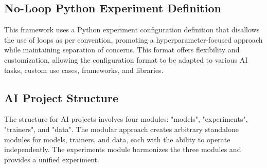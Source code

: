 \subsection{No-Loop Python Experiment Definition}

This framework uses a Python experiment configuration definition that disallows the use of loops as per convention, promoting a hyperparameter-focused approach while maintaining separation of concerns. This format offers flexibility and customization, allowing the configuration format to be adapted to various AI tasks, custom use cases, frameworks, and libraries.







\subsection{AI Project Structure}
The structure for AI projects involves four modules: "models", "experiments", "trainers", and "data". The modular approach creates arbitrary standalone modules for models, trainers, and data, each with the ability to operate independently. The experiments module harmonizes the three modules and provides a unified experiment. 




